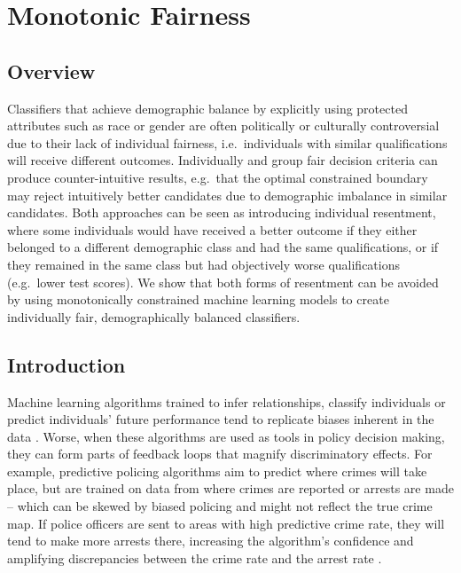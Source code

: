 \chapter{Monotonic Fairness}

\section{Overview}

    Classifiers that achieve demographic balance by explicitly using protected attributes such as race or gender are often politically or culturally controversial due to their lack of individual fairness, i.e.\ individuals with similar qualifications will receive different outcomes. Individually and group fair decision criteria can produce counter-intuitive results, e.g.\ that the optimal constrained boundary may reject intuitively better candidates due to demographic imbalance in similar candidates. Both approaches can be seen as introducing individual resentment, where some individuals would have received a better outcome if they either belonged to a different demographic class and had the same qualifications, or if they remained in the same class but had objectively worse qualifications (e.g.\ lower test scores). We show that both forms of resentment can be avoided by using monotonically constrained machine learning models to create individually fair, demographically balanced classifiers.

\section{Introduction}

    Machine learning algorithms trained to infer relationships, classify individuals or predict individuals' future performance tend to replicate biases inherent in the data \citep{Caliskan:Bryson:Narayanan:2017,Bornstein:2018,Angwin:Larson:Muttu:Kirchner:2016}. Worse, when these algorithms are used as tools in policy decision making, they can form parts of feedback loops that magnify discriminatory effects. For example, predictive policing algorithms aim to predict where crimes will take place, but are trained on data from where crimes are reported or arrests are made -- which can be skewed by biased policing and might not reflect the true crime map. If police officers are sent to areas with high predictive crime rate, they will tend to make more arrests there, increasing the algorithm's confidence and amplifying discrepancies between the crime rate and the arrest rate \citep{Ensign:2018,Lum:Isaac:2016}. 
    

